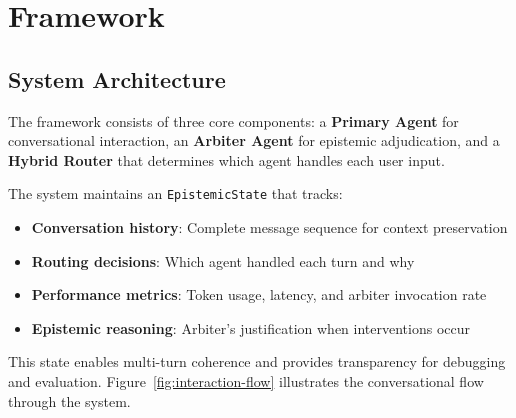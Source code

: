 \section{Framework}
\label{sec:framework}
\subsection{System Architecture}
\label{subsec:architecture}

The framework consists of three core components: a \textbf{Primary Agent} for conversational interaction, an \textbf{Arbiter Agent} for epistemic adjudication, and a \textbf{Hybrid Router} that determines which agent handles each user input.

The system maintains an \texttt{EpistemicState} that tracks:
\begin{itemize}
    \item \textbf{Conversation history}: Complete message sequence for context preservation
    \item \textbf{Routing decisions}: Which agent handled each turn and why
    \item \textbf{Performance metrics}: Token usage, latency, and arbiter invocation rate
    \item \textbf{Epistemic reasoning}: Arbiter's justification when interventions occur
\end{itemize}

This state enables multi-turn coherence and provides transparency for debugging and evaluation.
Figure~\ref{fig:interaction-flow} illustrates the conversational flow through the system.

